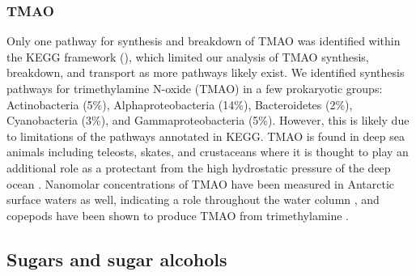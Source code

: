 \documentclass[utf8]{frontiersSCNS} %
\begin{document}
\subsubsection*{TMAO}
Only one pathway for synthesis and breakdown of TMAO was identified within the KEGG framework (), which limited our analysis of TMAO synthesis, breakdown, and transport as more pathways likely exist. We identified synthesis pathways for trimethylamine N-oxide (TMAO) in a few prokaryotic groups: Actinobacteria (5\%), Alphaproteobacteria (14\%), Bacteroidetes (2\%), Cyanobacteria (3\%), and Gammaproteobacteria (5\%). However, this is likely due to limitations of the pathways annotated in KEGG. TMAO is found in deep sea animals including teleosts, skates, and crustaceans where it is thought to play an additional role as a protectant from the high hydrostatic pressure of the deep ocean \citep{Yancey2002}. Nanomolar concentrations of TMAO have been measured in Antarctic surface waters as well, indicating a role throughout the water column \citep{Gibb2004}, and copepods have been shown to produce TMAO from trimethylamine \citep{Strom1979}.

\subsection{Sugars and sugar alcohols}
\end{document}
